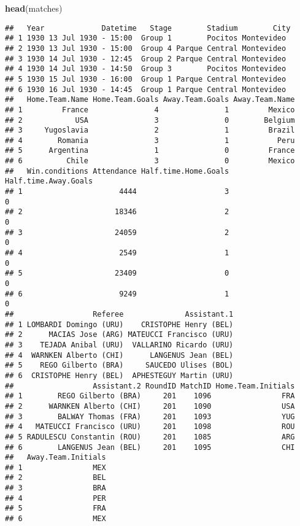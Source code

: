 \documentclass[]{article}
\newenvironment{Shaded}{\begin{snugshade}}{\end{snugshade}}
\newcommand{\KeywordTok}[1]{\textcolor[rgb]{0.13,0.29,0.53}{\textbf{#1}}}
\newcommand{\NormalTok}[1]{#1}
\begin{document}
\begin{Shaded}
\begin{Highlighting}[]
\KeywordTok{head}\NormalTok{(matches)}
\end{Highlighting}
\end{Shaded}

\begin{verbatim}
##   Year             Datetime   Stage        Stadium        City
## 1 1930 13 Jul 1930 - 15:00  Group 1        Pocitos Montevideo 
## 2 1930 13 Jul 1930 - 15:00  Group 4 Parque Central Montevideo 
## 3 1930 14 Jul 1930 - 12:45  Group 2 Parque Central Montevideo 
## 4 1930 14 Jul 1930 - 14:50  Group 3        Pocitos Montevideo 
## 5 1930 15 Jul 1930 - 16:00  Group 1 Parque Central Montevideo 
## 6 1930 16 Jul 1930 - 14:45  Group 1 Parque Central Montevideo 
##   Home.Team.Name Home.Team.Goals Away.Team.Goals Away.Team.Name
## 1         France               4               1         Mexico
## 2            USA               3               0        Belgium
## 3     Yugoslavia               2               1         Brazil
## 4        Romania               3               1           Peru
## 5      Argentina               1               0         France
## 6          Chile               3               0         Mexico
##   Win.conditions Attendance Half.time.Home.Goals Half.time.Away.Goals
## 1                      4444                    3                    0
## 2                     18346                    2                    0
## 3                     24059                    2                    0
## 4                      2549                    1                    0
## 5                     23409                    0                    0
## 6                      9249                    1                    0
##                  Referee              Assistant.1
## 1 LOMBARDI Domingo (URU)    CRISTOPHE Henry (BEL)
## 2      MACIAS Jose (ARG) MATEUCCI Francisco (URU)
## 3    TEJADA Anibal (URU)  VALLARINO Ricardo (URU)
## 4  WARNKEN Alberto (CHI)      LANGENUS Jean (BEL)
## 5    REGO Gilberto (BRA)     SAUCEDO Ulises (BOL)
## 6  CRISTOPHE Henry (BEL)  APHESTEGUY Martin (URU)
##                  Assistant.2 RoundID MatchID Home.Team.Initials
## 1        REGO Gilberto (BRA)     201    1096                FRA
## 2      WARNKEN Alberto (CHI)     201    1090                USA
## 3        BALWAY Thomas (FRA)     201    1093                YUG
## 4   MATEUCCI Francisco (URU)     201    1098                ROU
## 5 RADULESCU Constantin (ROU)     201    1085                ARG
## 6        LANGENUS Jean (BEL)     201    1095                CHI
##   Away.Team.Initials
## 1                MEX
## 2                BEL
## 3                BRA
## 4                PER
## 5                FRA
## 6                MEX
\end{verbatim}
\end{document}
